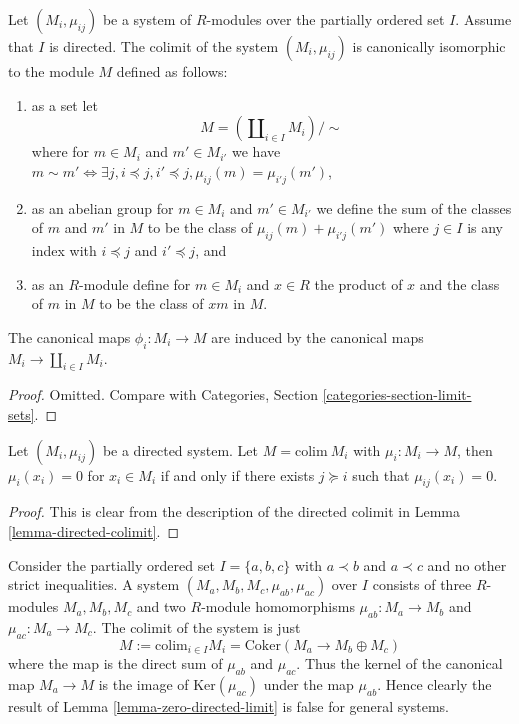 \begin{lemma}
\label{lemma-directed-colimit}
Let $(M_i, \mu_{ij})$ be a system of $R$-modules over the
partially ordered set $I$. Assume that $I$ is directed.
The colimit of the system $(M_i, \mu_{ij})$ is canonically
isomorphic to the module $M$ defined as follows:
\begin{enumerate}
\item as a set let
$$
M = (\coprod\nolimits_{i \in I} M_i)/\sim
$$
where for $m \in M_i$ and $m' \in M_{i'}$ we have
$m \sim m' \Leftrightarrow \exists j, i \preceq j, i' \preceq j,
\mu_{ij}(m) = \mu_{i'j}(m')$,
\item as an abelian group for $m \in M_i$ and $m' \in M_{i'}$
we define the sum of the classes of $m$ and $m'$ in $M$
to be the class of $\mu_{ij}(m) + \mu_{i'j}(m')$ where
$j \in I$ is any index with $i \preceq j$ and $i' \preceq j$, and
\item as an $R$-module define for $m \in M_i$ and $x \in R$
the product of $x$ and the class of $m$ in $M$ to be the
class of $xm$ in $M$.
\end{enumerate}
The canonical maps $\phi_i : M_i \to M$ are induced by the canonical
maps $M_i \to \coprod_{i \in I} M_i$.
\end{lemma}

\begin{proof}
Omitted. Compare with
Categories, Section \ref{categories-section-limit-sets}.
\end{proof}

\begin{lemma}
\label{lemma-zero-directed-limit}
Let $(M_i, \mu_{ij})$ be a directed system.
Let $M = \text{colim}\ M_i$ with $\mu_i : M_i\rightarrow M$,
then $\mu_i(x_i) = 0$ for $x_i\in M_i$ if and only if
there exists $j\succeq i$ such that $\mu_{ij}(x_i) = 0$.
\end{lemma}

\begin{proof}
This is clear from the description of the directed colimit
in Lemma \ref{lemma-directed-colimit}.
\end{proof}

\begin{example}
\label{example-zero-colimit-different}
Consider the partially ordered set $I = \{a, b, c\}$ with
$a \prec b$ and $a \prec c$ and no other strict inequalities.
A system $(M_a, M_b, M_c, \mu_{ab}, \mu_{ac})$
over $I$ consists of three $R$-modules $M_a, M_b, M_c$
and two $R$-module homomorphisms $\mu_{ab} : M_a \to M_b$ and
$\mu_{ac} : M_a \to M_c$.
The colimit of the system is just
$$
M := \text{colim}_{i \in I} M_i = \text{Coker}(M_a \to M_b \oplus M_c)
$$
where the map is the direct sum of $\mu_{ab}$ and $\mu_{ac}$.
Thus the kernel of the canonical map $M_a \to M$ is the image
of $\text{Ker}(\mu_{ac})$ under the map $\mu_{ab}$. Hence clearly
the result of Lemma \ref{lemma-zero-directed-limit} is false for
general systems.
\end{example}

